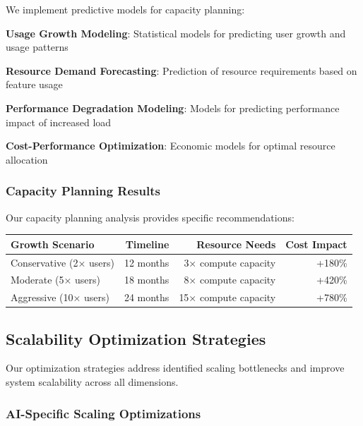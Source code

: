 We implement predictive models for capacity planning:

\begin{compactlist}
    \item \textbf{Usage Growth Modeling}: Statistical models for predicting user growth and usage patterns
    \item \textbf{Resource Demand Forecasting}: Prediction of resource requirements based on feature usage
    \item \textbf{Performance Degradation Modeling}: Models for predicting performance impact of increased load
    \item \textbf{Cost-Performance Optimization}: Economic models for optimal resource allocation
\end{compactlist}

\subsubsection*{Capacity Planning Results}

Our capacity planning analysis provides specific recommendations:

\begin{center}
\begin{tabular}{@{}lrrr@{}}
\toprule
\textbf{Growth Scenario} & \textbf{Timeline} & \textbf{Resource Needs} & \textbf{Cost Impact} \\
\midrule
Conservative (2× users) & 12 months & 3× compute capacity & +180\% \\
Moderate (5× users) & 18 months & 8× compute capacity & +420\% \\
Aggressive (10× users) & 24 months & 15× compute capacity & +780\% \\
\bottomrule
\end{tabular}
\end{center}

\subsection*{Scalability Optimization Strategies}

Our optimization strategies address identified scaling bottlenecks and improve system scalability across all dimensions.

\subsubsection*{AI-Specific Scaling Optimizations}

